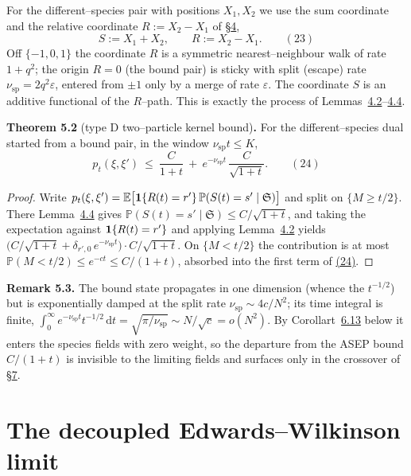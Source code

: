 \documentclass[11pt]{article}
\theoremstyle{plain}
\theoremstyle{definition}
\theoremstyle{remark}
\newcommand{\E}{\mathbb{E}}\newcommand{\PP}{\mathbb{P}}\newcommand{\dd}{\,\mathrm{d}}
\newcommand{\eps}{\varepsilon}\newcommand{\Exp}{\mathrm{Exp}}
\begin{document}
For the different--species pair with positions $X_1,X_2$ we use the sum coordinate and
the relative coordinate $R:=X_2-X_1$ of \S\hyperref[sec_lclt]{4},
\label{eq_SR}
\begin{equation}
  S:=X_1+X_2,\qquad R:=X_2-X_1.\qquad(23)
\end{equation}
Off $\{-1,0,1\}$ the coordinate $R$ is a symmetric nearest--neighbour walk of rate
$1+q^2$; the origin $R=0$ (the bound pair) is sticky with split (escape) rate
$\nu_{\mathrm{sp}}=2q^2\eps$, entered from $\pm1$ only by a merge of rate $\eps$. The
coordinate $S$ is an additive functional of the $R$--path. This is exactly the process
of Lemmas~\hyperref[lem_Rlclt]{4.2}--\hyperref[lem_Slclt]{4.4}.

\label{thm_kernel}\noindent\textbf{Theorem 5.2} (type D two--particle kernel bound)\textbf{.} 
For the different--species dual started from a bound pair, in the window
$\nu_{\mathrm{sp}}t\le K$,
\label{eq_kernel}
\begin{equation}
  p_t(\xi,\xi')\ \le\ \frac{C}{1+t}\ +\ e^{-\nu_{\mathrm{sp}}t}\,\frac{C}{\sqrt{1+t}}.\qquad(24)
\end{equation}
\par
\begin{proof}
Write $p_t(\xi,\xi')=\E\big[\bone\{R(t)=r'\}\,\PP(S(t)=s'\mid\mathfrak S)\big]$ and
split on $\{M\ge t/2\}$. There Lemma~\hyperref[lem_Slclt]{4.4} gives
$\PP(S(t)=s'\mid\mathfrak S)\le C/\sqrt{1+t}$, and taking the expectation against
$\mathbf 1\{R(t)=r'\}$ and applying Lemma~\hyperref[lem_Rlclt]{4.2} yields
$\big(C/\sqrt{1+t}+\delta_{r',0}\,e^{-\nu_{\mathrm{sp}}t}\big)\cdot C/\sqrt{1+t}$. On
$\{M<t/2\}$ the contribution is at most $\PP(M<t/2)\le e^{-ct}\le C/(1+t)$, absorbed
into the first term of \hyperref[eq_kernel]{(24)}.
\end{proof}

\label{rem_boundstate}\noindent\textbf{Remark 5.3.} 
The bound state propagates in one dimension (whence the $t^{-1/2}$) but is
exponentially damped at the split rate $\nu_{\mathrm{sp}}\sim4c/N^2$; its time integral
is finite, $\int_0^\infty e^{-\nu_{\mathrm{sp}}t}t^{-1/2}\dd t=\sqrt{\pi/\nu_{\mathrm{sp}}}
\sim N/\sqrt c=o(N^2)$. By Corollart~\hyperref[prop_sym]{6.13} below it enters the species fields
with zero weight, so the departure from the ASEP bound $C/(1+t)$ is invisible to the
limiting fields and surfaces only in the crossover of \S\hyperref[sec_cross]{7}.
\par

\section{The decoupled Edwards--Wilkinson limit}\label{sec_ew}
\end{document}
